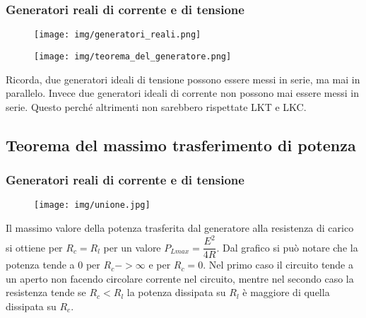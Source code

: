 \documentclass{article}
\begin{document}
\subsubsection{Generatori reali di corrente e di tensione}
\begin{figure}[h!]
    \begin{center}
        \texttt{[image: img/generatori\_reali.png]}
    \end{center}
\end{figure}

\medskip
\noindent{}

\begin{figure}[h!]
    \begin{center}
        \texttt{[image: img/teorema\_del\_generatore.png]}
    \end{center}
\end{figure}

\noindent Ricorda, due generatori ideali di tensione possono essere messi in serie, ma mai in parallelo. Invece due generatori ideali
 di corrente non possono mai essere messi in serie. Questo perché altrimenti non sarebbero rispettate LKT e LKC.


\subsection{Teorema del massimo trasferimento di potenza}

\subsubsection{Generatori reali di corrente e di tensione}
\begin{figure}[h!]
    \begin{center}
        \texttt{[image: img/unione.jpg]}
    \end{center}
\end{figure}

\noindent Il massimo valore della potenza trasferita dal generatore alla resistenza di carico si ottiene per $R_c=R_l$ 
per un valore $P_{Lmax}=\dfrac{E^2}{4R}$. Dal grafico si può notare che la potenza tende a 0 per $R_c->\infty$ e per $R_c=0$.
Nel primo caso il circuito tende a un aperto non facendo circolare corrente nel circuito, mentre nel secondo caso la resistenza
 tende se $R_c<R_l$ la potenza dissipata su $R_l$ è maggiore di quella dissipata su $R_c$.
\end{document}
